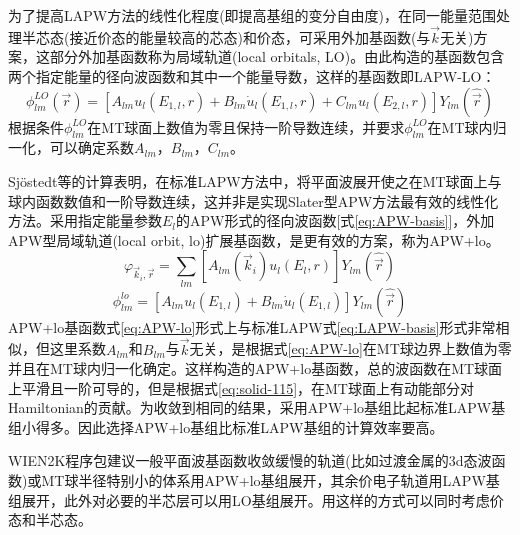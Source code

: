为了提高LAPW方法的线性化程度(即提高基组的变分自由度)，在同一能量范围处理半芯态(接近价态的能量较高的芯态)和价态，可采用外加基函数(与$\vec k$无关)方案，这部分外加基函数称为局域轨道(local orbitals, LO)\cite{PRB43-6388_1991,Singh}。由此构造的基函数包含两个指定能量的径向波函数和其中一个能量导数，这样的基函数即LAPW-LO：
\begin{equation}
  \phi_{lm}^{LO}(\vec r)=[A_{lm}u_l(E_{1,l},r)+B_{lm}\dot u_l(E_{1,l},r)+C_{lm}u_l(E_{2,l},r)]Y_{lm}(\hat{\vec r})
  \label{eq:LAPW-LO}
\end{equation}
根据条件$\phi_{lm}^{LO}$在MT球面上数值为零且保持一阶导数连续，并要求$\phi_{lm}^{LO}$在MT球内归一化，可以确定系数$A_{lm}$，$B_{lm}$，$C_{lm}$。

Sj\"ostedt等\cite{SSC114-15_2000}的计算表明，在标准LAPW方法中，将平面波展开使之在MT球面上与球内函数数值和一阶导数连续，这并非是实现Slater型APW方法最有效的线性化方法。采用指定能量参数$E_l$的APW形式的径向波函数[式\eqref{eq:APW-basis}]，外加APW型局域轨道(local orbit, lo)扩展基函数，是更有效的方案，称为APW+lo。
\begin{equation}
  \varphi_{\vec k_i,\vec r}=\sum_{lm}[A_{lm}(\vec k_i)u_l(E_l,r)]Y_{lm}(\hat{\vec r})
  \label{eq:APW-basis}
\end{equation}
\begin{equation}
  \phi_{lm}^{lo}=[A_{lm}u_l(E_{1,l})+B_{lm}\dot u_l(E_{1,l})]Y_{lm}(\hat{\vec r})
  \label{eq:APW-lo}
\end{equation}
APW+lo基函数式\eqref{eq:APW-lo}形式上与标准LAPW式\eqref{eq:LAPW-basis}形式非常相似，但这里系数$A_{lm}$和$B_{lm}$与$\vec k$无关，是根据式\eqref{eq:APW-lo}在MT球边界上数值为零并且在MT球内归一化确定。这样构造的APW+lo基函数，总的波函数在MT球面上平滑且一阶可导的，但是根据式\eqref{eq:solid-115}，在MT球面上有动能部分对Hamiltonian的贡献。为收敛到相同的结果，采用APW+lo基组比起标准LAPW基组小得多\cite{PRB64-195134_2001}。因此选择APW+lo基组比标准LAPW基组的计算效率要高。

WIEN2K程序包建议\cite{CPC59-399_1990,WIEN2K-UG_2001,CPC147-71_2002}一般平面波基函数收敛缓慢的轨道(比如过渡金属的3d态波函数)或MT球半径特别小的体系用APW+lo基组展开，其余价电子轨道用LAPW基组展开，此外对必要的半芯层可以用LO基组展开。用这样的方式可以同时考虑价态和半芯态。

